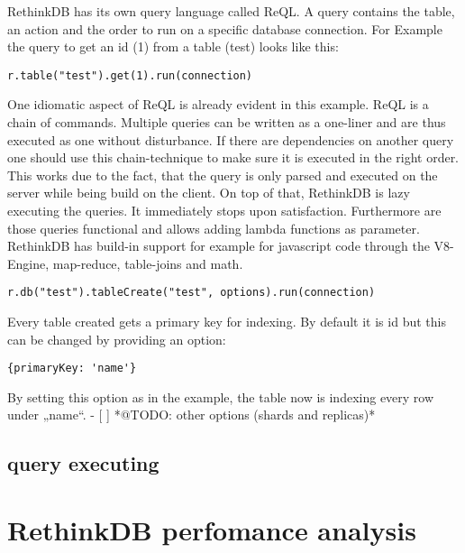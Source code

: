RethinkDB has its own query language called ReQL. A query contains the table, an action and the order to run on a specific database connection. For Example the query to get an id (1) from a table (test) looks like this:

\begin{lstlisting}[frame=single, caption=get document from Database  (javascript driver), label=rget]
r.table("test").get(1).run(connection)
\end{lstlisting}

One idiomatic aspect of ReQL is already evident in this example. ReQL is a chain of commands. Multiple queries can be written as a one-liner and are thus executed as one without disturbance. If there are dependencies on another query one should use this chain-technique to make sure it is executed in the right order. This works due to the fact, that the query is only parsed and executed on the server while being build on the client. On top of that, RethinkDB is lazy executing the queries.  It immediately stops upon satisfaction. 
Furthermore are those queries functional and allows adding lambda functions as parameter. RethinkDB has build-in support for example for javascript code through the V8-Engine, map-reduce, table-joins and math.

\begin{lstlisting}[frame=single, caption=create the table 'test', label=createTable]
r.db("test").tableCreate("test", options).run(connection)
\end{lstlisting}

Every table created gets a primary key for indexing. By default it is id but this can be changed by providing an option:
\begin{lstlisting}[frame=single, caption=options for create table, label=cTableOptions]
{primaryKey: 'name'}
\end{lstlisting}

By setting this option as in the example, the table now is indexing every row under „name“.
- [ ] *@TODO: other options (shards and replicas)*

\subsection{query executing}



\section{RethinkDB perfomance analysis}
